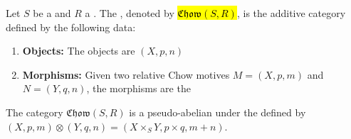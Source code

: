 \begin{definition} \label{definition:category_of_relative_chow_motives_over_a_noetherian_base_and_coefficients_in_a_commutative_ring}
Let $S$ be a  and $R$ a . 
The , denoted by \hl{$\mathfrak{Chow}(S, R)$}, is the additive category defined by the following data:

\begin{enumerate}
    \item \textbf{Objects:} The objects are  $(X, p, n)$

    \item \textbf{Morphisms:} Given two relative Chow motives $M = (X, p, m)$ and $N = (Y, q, n)$, the morphisms are the 
\end{enumerate}
The category $\mathfrak{Chow}(S, R)$ is a pseudo-abelian  under the  defined by $(X, p, m) \otimes (Y, q, n) = (X \times_S Y, p \times q, m+n)$.
\end{definition}